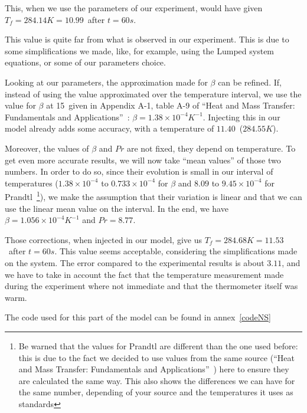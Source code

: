 \documentclass{report}
\begin{document}
	This, when we use the parameters of our experiment, would have given $T_f=284.14K=10.99$\textcelsius\ after $t=60s$.
	
	This value is quite far from what is observed in our experiment. This is due to some simplifications we made, like, for example, using the Lumped system equations, or some of our parameters choice.
	
	Looking at our parameters, the approximation made for $\beta$ can be refined. If, instead of using the value approximated over the temperature interval, we use the value for $\beta$ at 15\textcelsius\ given in Appendix A-1, table A-9 of ``Heat and Mass Transfer: Fundamentals and Applications''~\cite{HaMT}: $\beta=1.38\times 10^{-4} K^{-1}$. Injecting this in our model already adds some accuracy, with a temperature of $11.40$\textcelsius\ ($284.55K$).
	
	Moreover, the values of $\beta$ and $Pr$ are not fixed, they depend on temperature. To get even more accurate results, we will now take ``mean values'' of those two numbers. In order to do so, since their evolution is small in our interval of temperatures ($1.38\times 10^{-4}$ to $0.733\times 10^{-4}$ for $\beta$ and $8.09$ to $9.45\times 10^{-4}$ for Prandtl~\footnote{Be warned that the values for Prandtl are different than the one used before: this is due to the fact we decided to use values from the same source (``Heat and Mass Transfer: Fundamentals and Applications''~\cite{HaMT}) here to ensure they are calculated the same way. This also shows the differences we can have for the same number, depending of your source and the temperatures it uses as standards}), we make the assumption that their variation is linear and that we can use the linear mean value on the interval. In the end, we have $\beta=1.056\times 10^{-4} K^{-1}$ and $Pr=8.77$.
	
	Those corrections, when injected in our model, give us $T_f=284.68K=11.53$\textcelsius\ after $t=60s$. This value seems acceptable, considering the simplifications made on the system. The error compared to the experimental results is about $3.11$\textdiscount, and we have to take in account the fact that the temperature measurement made during the experiment where not immediate and that the thermometer itself was warm.
	
	The code used for this part of the model can be found in annex~\ref{codeNS}
	
\end{document}
